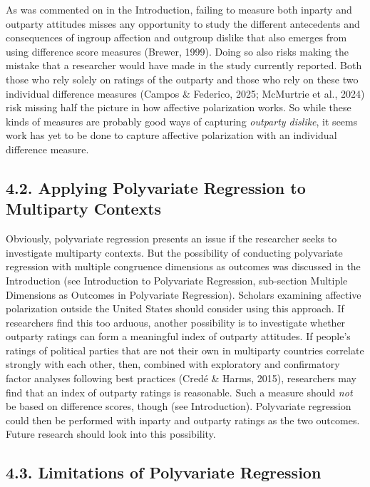 \documentclass[authordate, meta]{jote-new-article}
\begin{document}
	As was commented on in the Introduction, failing to measure both inparty and outparty attitudes misses any opportunity to study the different antecedents and consequences of ingroup affection and outgroup dislike that also emerges from using difference score measures (Brewer, 1999). Doing so also risks making the mistake that a researcher would have made in the study currently reported. Both those who rely solely on ratings of the outparty and those who rely on these two individual difference measures (Campos \& Federico, 2025; McMurtrie et al., 2024) risk missing half the picture in how affective polarization works. So while these kinds of measures are probably good ways of capturing \emph{outparty dislike}, it seems work has yet to be done to capture affective polarization with an individual difference measure.



	\subsection{4.2. Applying Polyvariate Regression to Multiparty Contexts}



	Obviously, polyvariate regression presents an issue if the researcher seeks to investigate multiparty contexts. But the possibility of conducting polyvariate regression with multiple congruence dimensions as outcomes was discussed in the Introduction (see Introduction to Polyvariate Regression, sub-section Multiple Dimensions as Outcomes in Polyvariate Regression). Scholars examining affective polarization outside the United States should consider using this approach. If researchers find this too arduous, another possibility is to investigate whether outparty ratings can form a meaningful index of outparty attitudes. If people's ratings of political parties that are not their own in multiparty countries correlate strongly with each other, then, combined with exploratory and confirmatory factor analyses following best practices (Credé \& Harms, 2015), researchers may find that an index of outparty ratings is reasonable. Such a measure should \emph{not }be based on difference scores, though (see Introduction). Polyvariate regression could then be performed with inparty and outparty ratings as the two outcomes. Future research should look into this possibility.



	\subsection{4.3. Limitations of Polyvariate Regression}
\end{document}
